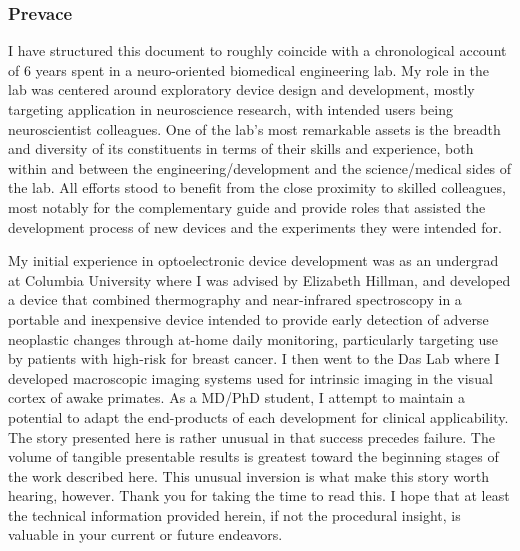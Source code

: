 \hypertarget{preface}{%
\subsubsection*{Prevace}\label{preface}}

I have structured this document to roughly coincide with a chronological
account of 6 years spent in a neuro-oriented biomedical engineering lab.
My role in the lab was centered around exploratory device design and
development, mostly targeting application in neuroscience research, with
intended users being neuroscientist colleagues. One of the lab's most
remarkable assets is the breadth and diversity of its constituents in
terms of their skills and experience, both within and between the
engineering/development and the science/medical sides of the lab. All
efforts stood to benefit from the close proximity to skilled colleagues,
most notably for the complementary guide and provide roles that assisted
the development process of new devices and the experiments they were
intended for.

My initial experience in optoelectronic device development was as an
undergrad at Columbia University where I was advised by Elizabeth
Hillman, and developed a device that combined thermography and
near-infrared spectroscopy in a portable and inexpensive device intended
to provide early detection of adverse neoplastic changes through at-home
daily monitoring, particularly targeting use by patients with high-risk
for breast cancer. I then went to the Das Lab where I developed
macroscopic imaging systems used for intrinsic imaging in the visual
cortex of awake primates. As a MD/PhD student, I attempt to maintain a
potential to adapt the end-products of each development for clinical
applicability. The story presented here is rather unusual in that
success precedes failure. The volume of tangible presentable results is
greatest toward the beginning stages of the work described here. This
unusual inversion is what make this story worth hearing, however. Thank
you for taking the time to read this. I hope that at least the technical
information provided herein, if not the procedural insight, is valuable
in your current or future endeavors.
